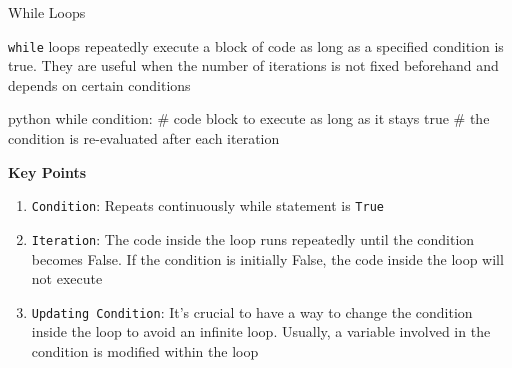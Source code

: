 \documentclass[
	11pt, 
]{beamer}
\begin{document}

\begin{frame}[fragile]{While Loops}

\texttt{while} loops repeatedly execute a block of code as long as a specified condition is true. They are useful when the number of iterations is not fixed beforehand and depends on certain conditions

\begin{mintedbox}{python}
while condition:
# code block to execute as long as it stays true
# the condition is re-evaluated after each iteration
\end{mintedbox}

\begin{block}{\textbf{Key Points}}
    \begin{enumerate}
        \item \texttt{Condition}: Repeats continuously while statement is \texttt{True}

        \item \texttt{Iteration}: The code inside the loop runs repeatedly until the condition becomes False. If the condition is initially False, the code inside the loop will not execute

        \item  \texttt{Updating Condition}: It's crucial to have a way to change the condition inside the loop to avoid an infinite loop. Usually, a variable involved in the condition is modified within the loop
    \end{enumerate}
\end{block}

\end{frame}

\end{document}
